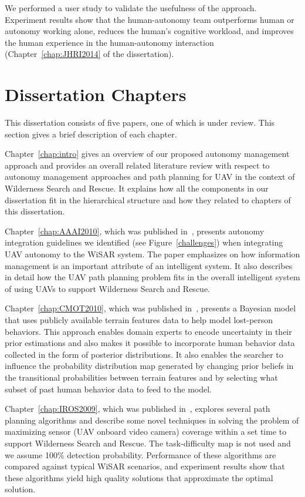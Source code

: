 We performed a user study to validate the usefulness of the approach. Experiment results show that the human-autonomy team outperforms human or autonomy working alone, reduces the human's cognitive workload, and improves the human experience in the human-autonomy interaction (Chapter~\ref{chap:JHRI2014} of the dissertation).


\section{Dissertation Chapters}

This dissertation consists of five papers, one of which is under review. This section gives a brief description of each chapter.

Chapter~\ref{chap:intro} gives an overview of our proposed autonomy management approach and provides an overall related literature review with respect to autonomy management approaches and path planning for UAV in the context of Wilderness Search and Rescue. It explains how all the components in our dissertation fit in the hierarchical structure and how they related to chapters of this dissertation.

Chapter~\ref{chap:AAAI2010}, which was published in~\cite{Lin2010Supporting}, presents autonomy integration guidelines we identified (see Figure~\ref{challenges}) when integrating UAV autonomy to the WiSAR system. The paper emphasizes on how information management is an important attribute of an intelligent system. It also describes in detail how the UAV path planning problem fits in the overall intelligent system of using UAVs to support Wilderness Search and Rescue.

Chapter~\ref{chap:CMOT2010}, which was published in~\cite{Lin2010Bayesian}, presents a Bayesian model that uses publicly available terrain features data to help model lost-person behaviors. This approach enables domain experts to encode uncertainty in their prior estimations and also makes it possible to incorporate human behavior data collected in the form of posterior distributions. It also enables the searcher to influence the probability distribution map generated by changing prior beliefs in the transitional probabilities between terrain features and by selecting what subset of past human behavior data to feed to the model.

Chapter~\ref{chap:IROS2009}, which was published in~\cite{Lin2009UAV}, explores several path planning algorithms and describe some novel techniques in solving the problem of maximizing sensor (UAV onboard video camera) coverage within a set time to support Wilderness Search and Rescue. The task-difficulty map is not used and we assume 100\% detection probability. Performance of these algorithms are compared against typical WiSAR scenarios, and experiment results show that these algorithms yield high quality solutions that approximate the optimal solution.

